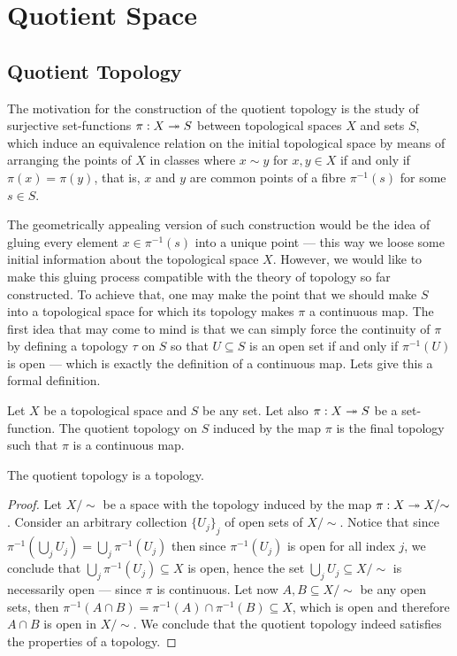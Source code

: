 \section{Quotient Space}

\subsection{Quotient Topology}

The motivation for the construction of the quotient topology is the study of
surjective set-functions \(\pi: X \twoheadrightarrow S\) between topological spaces \(X\) and
sets \(S\), which induce an equivalence relation on the initial topological
space by means of arranging the points of \(X\) in classes where \(x \sim y\)
for \(x, y \in X\) if and only if \(\pi(x) = \pi(y)\), that is, \(x\) and \(y\)
are common points of a fibre \(\pi^{-1}(s)\) for some \(s \in S\).

The geometrically appealing version of such construction would be the idea of
gluing every element \(x \in \pi^{-1}(s)\) into a unique point --- this way we
loose some initial information about the topological space \(X\). However, we
would like to make this gluing process compatible with the theory of topology so
far constructed. To achieve that, one may make the point that we should make
\(S\) into a topological space for which its topology makes \(\pi\) a continuous
map. The first idea that may come to mind is that we can simply force the
continuity of \(\pi\) by defining a topology \(\tau\) on \(S\) so that
\(U \subseteq S\) is an open set if and only if \(\pi^{-1}(U)\) is open ---
which is exactly the definition of a continuous map. Lets give this a formal
definition.

\begin{definition}\label{def:quotient-topology}
Let \(X\) be a topological space and \(S\) be any set. Let also \(\pi: X \twoheadrightarrow S\)
be a set-function. The quotient topology on \(S\) induced by the map \(\pi\) is
the final topology such that \(\pi\) is a continuous map.
\end{definition}

\begin{proposition}
The quotient topology is a topology.
\end{proposition}

\begin{proof}
Let \(X /{\sim}\) be a space with the topology induced by the map
\(\pi: X \twoheadrightarrow X /{\sim}\). Consider an arbitrary collection \({\{U_{j}\}}_j\) of
open sets of \(X /{\sim}\). Notice that since
\(\pi^{-1}(\bigcup_{j} U_{j}) = \bigcup_j \pi^{-1}(U_j)\) then since
\(\pi^{-1}(U_j)\) is open for all index \(j\), we conclude that
\(\bigcup_j \pi^{-1}(U_{j}) \subseteq X\) is open, hence the set
\(\bigcup_j U_j \subseteq X /{\sim}\) is necessarily open --- since \(\pi\) is
continuous. Let now \(A, B \subseteq X /{\sim}\) be any open sets, then
\(\pi^{-1}(A \cap B) = \pi^{-1}(A) \cap \pi^{-1}(B) \subseteq X\), which is open
and therefore \(A \cap B\) is open in \(X /{\sim}\). We conclude that the
quotient topology indeed satisfies the properties of a topology.
\end{proof}


